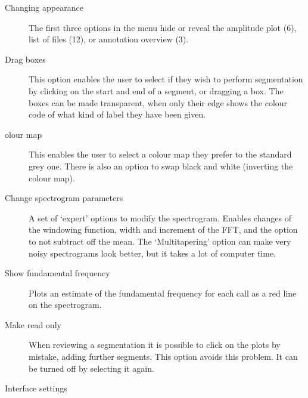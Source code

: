 \documentclass{article}
\begin{document}
\begin{description}
\item [Changing appearance] The first three options in the menu hide or reveal the amplitude plot (6), list of files (12), or annotation overview (3). 
\item [Drag boxes] This option enables the user to select if they wish to perform segmentation by clicking on the start and end of a segment, or dragging a box. The boxes can be made transparent, when only their edge shows the colour code of what kind of label they have been given.
\item [olour map] This enables the user to select a colour map they prefer to the standard grey one. There is also an option to swap black and white (inverting the colour map). 
\item [Change spectrogram parameters] A set of `expert' options to modify the spectrogram. Enables changes of the windowing function, width and increment of the FFT, and the option to not subtract off the mean. The `Multitapering' option can make very noisy spectrograms look better, but it takes a lot of computer time. 
\item [Show fundamental frequency] Plots an estimate of the fundamental frequency for each call as a red line on the spectrogram.
\item [Make read only] When reviewing a segmentation it is possible to click on the plots by mistake, adding further segments. This option avoids this problem. It can be turned off by selecting it again. 
\item [Interface settings]  
\end{description}
\end{document}
